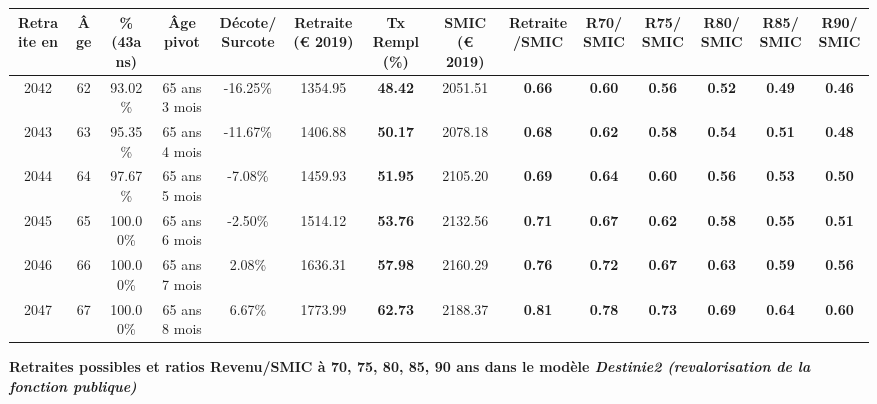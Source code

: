 \begin{adjustbox}{max width=\textwidth} 
\begin{tabular}[htb]{|c|c||c|c|c||c|c||c|c||c|c|c|c|c|} 
\hline 
 Retraite en &  Âge &  \%(43ans) &  Âge pivot &  Décote/Surcote &  Retraite (\euro{} 2019) &  Tx Rempl(\%) &  SMIC (\euro{} 2019) &  Retraite/SMIC &  R70/SMIC &  R75/SMIC &  R80/SMIC &  R85/SMIC &  R90/SMIC \\ 
\hline \hline 
 2042 &  62 &  93.02\% &  65 ans 3 mois &  -16.25\% &  1354.95 &  {\bf 48.42} &  2051.51 &  {\bf {\color{red} 0.66}} &  {\bf {\color{red} 0.60}} &  {\bf {\color{red} 0.56}} &  {\bf {\color{red} 0.52}} &  {\bf {\color{red} 0.49}} &  {\bf {\color{red} 0.46}} \\ 
\hline 
 2043 &  63 &  95.35\% &  65 ans 4 mois &  -11.67\% &  1406.88 &  {\bf 50.17} &  2078.18 &  {\bf {\color{red} 0.68}} &  {\bf {\color{red} 0.62}} &  {\bf {\color{red} 0.58}} &  {\bf {\color{red} 0.54}} &  {\bf {\color{red} 0.51}} &  {\bf {\color{red} 0.48}} \\ 
\hline 
 2044 &  64 &  97.67\% &  65 ans 5 mois &  -7.08\% &  1459.93 &  {\bf 51.95} &  2105.20 &  {\bf {\color{red} 0.69}} &  {\bf {\color{red} 0.64}} &  {\bf {\color{red} 0.60}} &  {\bf {\color{red} 0.56}} &  {\bf {\color{red} 0.53}} &  {\bf {\color{red} 0.50}} \\ 
\hline 
 2045 &  65 &  100.00\% &  65 ans 6 mois &  -2.50\% &  1514.12 &  {\bf 53.76} &  2132.56 &  {\bf {\color{red} 0.71}} &  {\bf {\color{red} 0.67}} &  {\bf {\color{red} 0.62}} &  {\bf {\color{red} 0.58}} &  {\bf {\color{red} 0.55}} &  {\bf {\color{red} 0.51}} \\ 
\hline 
 2046 &  66 &  100.00\% &  65 ans 7 mois &  2.08\% &  1636.31 &  {\bf 57.98} &  2160.29 &  {\bf {\color{red} 0.76}} &  {\bf {\color{red} 0.72}} &  {\bf {\color{red} 0.67}} &  {\bf {\color{red} 0.63}} &  {\bf {\color{red} 0.59}} &  {\bf {\color{red} 0.56}} \\ 
\hline 
 2047 &  67 &  100.00\% &  65 ans 8 mois &  6.67\% &  1773.99 &  {\bf 62.73} &  2188.37 &  {\bf {\color{red} 0.81}} &  {\bf {\color{red} 0.78}} &  {\bf {\color{red} 0.73}} &  {\bf {\color{red} 0.69}} &  {\bf {\color{red} 0.64}} &  {\bf {\color{red} 0.60}} \\ 
\hline 
\hline 
\end{tabular} 
\end{adjustbox} 
 
 \vspace{0.1cm} 
{\bf \noindent Retraites possibles et ratios Revenu/SMIC à 70, 75, 80, 85, 90 ans dans le modèle \emph{Destinie2 (revalorisation de la fonction publique)}}  
 
